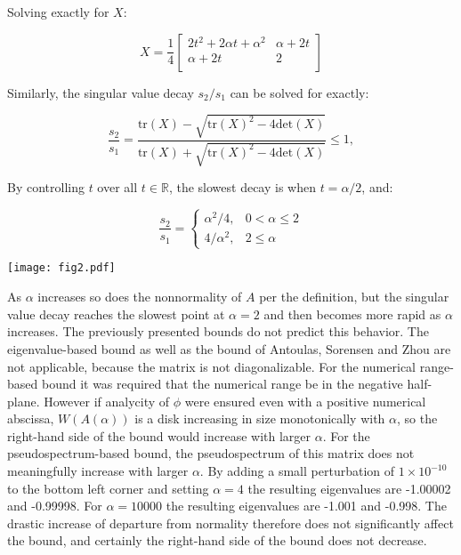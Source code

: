 \documentclass[12pt]{scrartcl}
\begin{document}
Solving exactly for $X$:

\[
X = \frac{1}{4}
 \begin{bmatrix}
  2t^{2}+2 \alpha t + \alpha^2 & \alpha + 2t \\
  \alpha + 2t & 2 \\
 \end{bmatrix}
\] 




Similarly, the singular value decay $s_{2}/s_{1}$ can be solved for exactly:

$$\frac{s_{2}}{s_{1}}=\frac{\text{tr}(X)-\sqrt{\text{tr}(X)^{2}-4\text{det}(X)}}{\text{tr}(X)+\sqrt{\text{tr}(X)^{2}-4\text{det}(X)}} \leq 1,$$

By controlling $t$ over all $t \in \mathbb{R}$, the slowest decay is when $t=\alpha/2$, and: 

$$    \frac{s_{2}}{s_{1}}=
    \begin{cases}
      \alpha^{2}/4, & 0<\alpha \leq 2 \\
      4/\alpha^{2}, & 2 \leq \alpha
    \end{cases} $$


\begin{center}
\texttt{[image: fig2.pdf]}
\end{center}

As $\alpha$ increases so does the nonnormality of $A$ per the definition, but the singular value decay reaches the slowest point at $\alpha=2$ and then becomes more rapid as $\alpha$ increases. 
The previously presented bounds do not predict this behavior. The eigenvalue-based bound as well as the bound of Antoulas, Sorensen and Zhou are not applicable, because the matrix is not diagonalizable. For the numerical range-based bound it was required that the numerical range be in the negative half-plane. However if analycity of $\phi$ were ensured even with a positive numerical abscissa, $W(A(\alpha))$ is a disk increasing in size monotonically with $\alpha$, so the right-hand side of the bound would increase with larger $\alpha$. For the pseudospectrum-based bound, the pseudospectrum of this matrix does not meaningfully increase with larger $\alpha$. By adding a small perturbation of $1 \times 10^{-10}$ to the bottom left corner and setting $\alpha=4$ the resulting eigenvalues are -1.00002 and -0.99998. For $\alpha=10000$ the resulting eigenvalues are -1.001 and -0.998. The drastic increase of departure from normality therefore does not significantly affect the bound, and certainly the right-hand side of the bound does not decrease.
\end{document}
